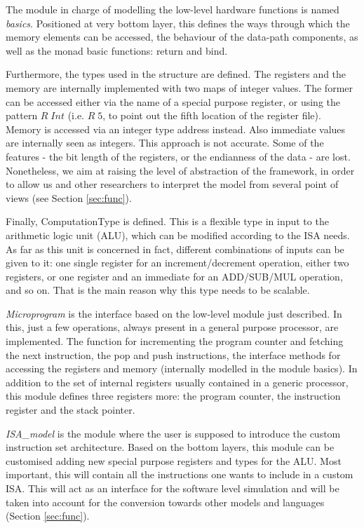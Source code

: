 \documentclass[conference]{IEEEtran}
\begin{document}
The module in charge of modelling the low-level hardware functions is named
\textit{basics}. Positioned at very bottom layer, this defines the ways through which the
memory elements can be accessed, the behaviour of the data-path components, 
as well as the monad basic functions: return and bind.

Furthermore, the types used in the structure are defined.
The registers and the memory are internally implemented with two maps of integer values.
The former can be accessed either via the name of a
special purpose register, or using the pattern $R \; Int$ (i.e. $R \; 5$, to point out the
fifth location of the register file). Memory is accessed via an integer type address instead.
Also immediate values are internally seen as integers. This approach is not
accurate. Some of the features - the bit length of the registers, or the
endianness of the data - are lost. Nonetheless, we aim at raising the level of abstraction of
the framework, in order to allow us and other researchers to interpret the model from
several point of views (see Section \ref{sec:func}).

Finally, ComputationType is defined. This is a flexible type in input to the
arithmetic logic unit (ALU), which can be modified according to the ISA
needs. As far as this unit is concerned in fact, different combinations of inputs can be
given to it: one single register for an increment/decrement operation, either two 
registers, or one register and an immediate for an ADD/SUB/MUL operation, and so on.
That is the main reason why this type needs to be scalable.

\textit{Microprogram} is the interface based on the low-level module just described.
In this, just a few operations, always present in a general purpose processor, are
implemented. The function for incrementing the program counter and fetching
the next instruction, the pop and push instructions, the interface methods for accessing
the registers and memory (internally modelled in the module basics).
In addition to the set of internal registers usually contained in a generic processor,
this module defines three registers more: the program counter, the instruction register and
the stack pointer.

\textit{ISA\_model} is the module where the user is supposed to introduce the custom 
instruction set architecture. Based on the bottom layers, this
module can be customised adding new special purpose registers and types for the ALU.
Most important, this will contain all the instructions one wants to include in a custom ISA. This will act as an interface for the software level simulation and will be taken into
account for the conversion towards other models and languages (Section \ref{sec:func}).
\end{document}
